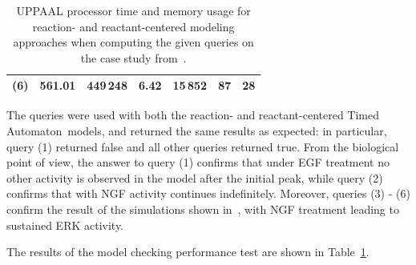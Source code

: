 \documentclass{llncs}
\newcommand{\ta}{Timed Automaton}
\begin{document}
\begin{table}[htbp]
\begin{center}
\begin{tabular}{|c||r|r||r|r||r|r|}
      \hline
      (6) & 561.01 & 449\,{}248 & 6.42 & 15\,{}852 & 87 & 28 \\ %
      \hline
    \end{tabular}
  \end{center}
  \caption{\scriptsize UPPAAL processor time and memory usage for reaction- and reactant-centered modeling approaches when computing
  the given queries on the case study from~\cite{animo-ieee}.\label{tab:model-checking}}
\vspace{-.5cm}
\end{table}

The queries were used with both the reaction- and reactant-centered \ta\ models,
and returned the same results as expected: in particular, query (1) returned false and all other queries returned true.
From the biological point of view, the answer to query (1) confirms that under EGF treatment no other activity is observed in the model after the initial peak,
while query (2) confirms that with NGF activity continues indefinitely.
Moreover, queries (3) - (6) confirm the result of the simulations shown in~\cite{animo-ieee}, with NGF treatment leading to sustained ERK activity.

The results of the model checking performance test are shown in Table~\ref{tab:model-checking}.
\end{document}
